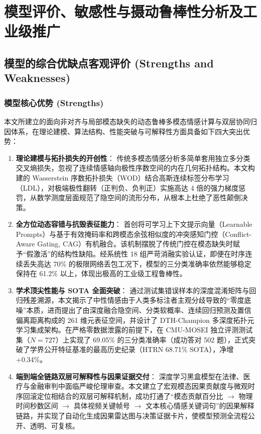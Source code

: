 \section{模型评价、敏感性与摄动鲁棒性分析及工业级推广}

\subsection{模型的综合优缺点客观评价 (Strengths and Weaknesses)}

\subsubsection{模型核心优势 (Strengths)}
本文所建立的面向非对齐与局部模态缺失的动态鲁棒多模态情感计算与双层协同归因体系，在理论建模、算法结构、性能突破与可解释性方面具备如下四大突出优势：
\begin{enumerate}
    \item \textbf{理论建模与拓扑损失的开创性}：
    传统多模态情感分析多简单套用独立多分类交叉熵损失，忽视了连续情感轴向极性序数空间的内在几何拓扑结构。本文构建的 Wasserstein 序数拓扑损失（WOD）结合高斯连续标签分布学习（LDL），对极端极性翻转（正判负、负判正）实施高达 4 倍的强力梯度惩罚，从数学测度层面规范了隐空间的流形分布，从根本上杜绝了恶性颠倒决策。
    
    \item \textbf{全方位动态容错与抗毁表征能力}：
    首创将可学习上下文提示向量（Learnable Prompts）与基于有效掩码率和跨模态余弦相似度的冲突感知门控（Conflict-Aware Gating, CAG）有机融合。该机制摆脱了传统门控在模态缺失时赋予“假激活”的结构性缺陷。经系统性 18 组严苛消融实验认证，即便在时序连续丢失高达 70\% 的极限网络丢包工况下，模型的三分类准确率依然能够稳定保持在 61.2\% 以上，体现出极高的工业级工程鲁棒性。

    \item \textbf{学术顶尖性能与 SOTA 全面突破}：
    通过测试集错误样本的深度混淆矩阵与回归残差溯源，本文揭示了中性情感由于人类多标注者主观分歧导致的“零度底噪”本质，进而提出了由深度融合隐空间、分类软概率、连续回归预测及置信偏离距离构成的 261 维元表征空间，并设计了 DTH-Champion 多深度拓扑元学习集成架构。在严格零数据泄露的前提下，在 CMU-MOSEI 独立评测测试集（$N=727$）上实现了 69.05\% 的三分类准确率（成功答对 502 题），正式突破了学界公开特征基准的最高历史纪录（HTRN 68.71\% SOTA），净增 +0.34\%。

    \item \textbf{端到端全链路双层可解释性与因果证据交付}：
    深度学习黑盒模型在法律、医疗与金融审判中面临严峻伦理审查。本文建立了宏观模态因果贡献度与微观时序回滚定位相结合的双层可解释机制，成功打通了“模态贡献百分比 $\to$ 物理时间秒数区间 $\to$ 具体视频关键帧号 $\to$ 文本核心情感关键词句”的因果解释链路，并实现了自动化生成因果雷达图与决策证据卡片，使模型预测全流程公开、透明、可复核。
\end{enumerate}

